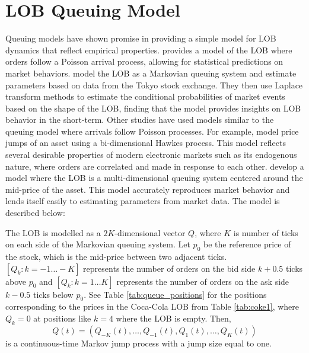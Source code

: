 \section{LOB Queuing Model} \label{modelLOB}
Queuing models have shown promise in providing a simple model for LOB dynamics that reflect empirical properties. \cite{A6a} provides a model of the LOB where orders follow a Poisson arrival process, allowing for statistical predictions on market behaviors. \cite{A6b} model the LOB as a Markovian queuing system and estimate parameters based on data from the Tokyo stock exchange. They then use Laplace transform methods to estimate the conditional probabilities of market events based on the shape of the LOB, finding that the model provides insights on LOB behavior in the short-term. Other studies have used models similar to the queuing model where arrivals follow Poisson processes. For example, \cite{A9} model price jumps of an asset using a bi-dimensional Hawkes process. This model reflects several desirable properties of modern electronic markets such as its endogenous nature, where orders are correlated and made in response to each other. \cite{A6} develop a model where the LOB is a multi-dimensional queuing system centered around the mid-price of the asset. This model accurately reproduces market behavior and lends itself easily to estimating parameters from market data. The model is described below:

The LOB is modelled as a $2K$-dimensional vector $Q$, where $K$ is number of ticks on each side of the Markovian queuing system. Let $p_0$ be the reference price of the stock, which is the mid-price between two adjacent ticks. $[Q_k: k = -1 \ldots -K]$ represents the number of orders on the bid side $k + 0.5$ ticks above $p_0$ and $[Q_k: k =1 \ldots K]$ represents the number of orders on the ask side $k - 0.5$ ticks below $p_0$. See Table \ref{tab:queue_positions} for the positions corresponding to the prices in the Coca-Cola LOB from Table \ref{tab:coke1}, where $Q_k = 0$ at positions like $k=4$ where the LOB is empty. Then, $$Q(t) = (Q_{-K}(t), \ldots, Q_{-1}(t), Q_1(t), \ldots , Q_K(t))$$ is a continuous-time Markov jump process with a jump size equal to one.

